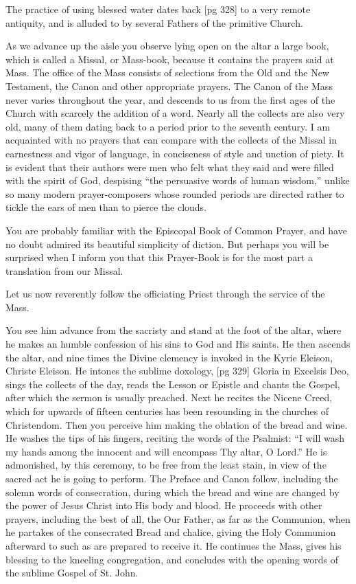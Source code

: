 The practice of using blessed water dates back
[pg 328]
to a very remote antiquity, and is alluded to by
several Fathers of the primitive Church.

As we advance up the aisle you observe
lying open on the altar a large book, which is
called a Missal, or Mass-book, because it contains
the prayers said at Mass. The office of the Mass
consists of selections from the Old and the New
Testament, the Canon and other appropriate
prayers. The Canon of the Mass never varies
throughout the year, and descends to us from the
first ages of the Church with scarcely the addition
of a word. Nearly all the collects are also very
old, many of them dating back to a period prior
to the seventh century. I am acquainted with no
prayers that can compare with the collects of the
Missal in earnestness and vigor of language, in
conciseness of style and unction of piety. It is
evident that their authors were men who felt what
they said and were filled with the spirit of God,
despising “the persuasive words of human wisdom,”
unlike so many modern prayer-composers
whose rounded periods are directed rather to
tickle the ears of men than to pierce the clouds.

You are probably familiar with the Episcopal
Book of Common Prayer, and have no doubt admired
its beautiful simplicity of diction. But
perhaps you will be surprised when I inform you
that this Prayer-Book is for the most part a
translation from our Missal.

Let us now reverently follow the officiating
Priest through the service of the Mass.

You see him advance from the sacristy and
stand at the foot of the altar, where he makes an
humble confession of his sins to God and His
saints. He then ascends the altar, and nine times
the Divine clemency is invoked in the Kyrie Eleison,
Christe Eleison. He intones the sublime doxology,
[pg 329]
Gloria in Excelsis Deo, sings the collects of
the day, reads the Lesson or Epistle and chants
the Gospel, after which the sermon is usually
preached. Next he recites the Nicene Creed,
which for upwards of fifteen centuries has been
resounding in the churches of Christendom. Then
you perceive him making the oblation of the bread
and wine. He washes the tips of his fingers, reciting
the words of the Psalmist: “I will wash my
hands among the innocent and will encompass
Thy altar, O Lord.” He is admonished, by this
ceremony, to be free from the least stain, in view
of the sacred act he is going to perform. The
Preface and Canon follow, including the solemn
words of consecration, during which the bread
and wine are changed by the power of Jesus
Christ into His body and blood. He proceeds with
other prayers, including the best of all, the Our
Father, as far as the Communion, when he partakes
of the consecrated Bread and chalice, giving
the Holy Communion afterward to such as are
prepared to receive it. He continues the Mass,
gives his blessing to the kneeling congregation,
and concludes with the opening words of the sublime
Gospel of St. John.

